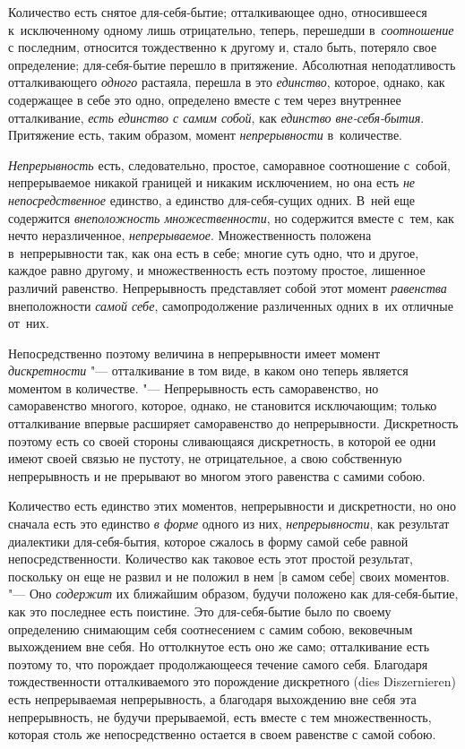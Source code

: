 

Количество есть снятое для-себя-бытие; отталкивающее одно, относившееся
к~исключенному одному лишь отрицательно, теперь, перешедши в~{\em соотношение}
с последним, относится тождественно к другому и, стало быть, потеряло свое
определение; для-себя-бытие перешло в притяжение. Абсолютная неподатливость
отталкивающего {\em одного} растаяла, перешла в это {\em единство}, которое,
однако, как содержащее в себе это одно, определено вместе с тем через
внутреннее отталкивание, {\em есть единство с самим собой}, как
{\em единство вне-себя-бытия}. Притяжение есть, таким образом, момент
{\em непрерывности} в~количестве.

{\em Непрерывность} есть, следовательно, простое, саморавное соотношение
с~собой, непрерываемое никакой границей и никаким исключением, но она есть
{\em не непосредственное} единство, а единство для-себя-сущих одних. В~ней
еще содержится {\em внеположность множественности}, но содержится вместе
с~тем, как нечто неразличенное, {\em непрерываемое}. Множественность положена
в~непрерывности так, как она есть в себе; многие суть одно, что и другое,
каждое равно другому, и множественность есть поэтому простое, лишенное
различий равенство. Непрерывность представляет собой этот момент
{\em равенства} внеположности {\em самой себе}, самопродолжение различенных
одних в~их отличные от~них.

Непосредственно поэтому величина в непрерывности имеет момент
{\em дискретности} "--- отталкивание в том виде, в каком оно теперь является
моментом в количестве. "--- Непрерывность есть саморавенство, но саморавенство
многого, которое, однако, не становится исключающим; только отталкивание
впервые расширяет саморавенство до непрерывности. Дискретность поэтому есть
со своей стороны сливающаяся дискретность, в которой ее одни имеют своей связью
не пустоту, не отрицательное, а свою собственную непрерывность и не прерывают
во многом этого равенства с самими собою.

Количество есть единство этих моментов, непрерывности и дискретности, но оно
сначала есть это единство {\em в форме} одного из них, {\em непрерывности}, как
результат диалектики для-себя-бытия, которое сжалось в форму самой себе равной
непосредственности. Количество как таковое есть этот простой результат,
поскольку он еще не развил и не положил в нем [в самом себе] своих моментов.
"--- Оно {\em содержит} их ближайшим образом, будучи положено как
для-себя-бытие, как это последнее есть поистине. Это для-себя-бытие было по
своему определению снимающим себя соотнесением с самим собою, вековечным
выхождением вне себя. Но оттолкнутое есть оно же само; отталкивание есть
поэтому то, что порождает продолжающееся течение самого себя. Благодаря
тождественности отталкиваемого это порождение дискретного (dies Diszernieren)
есть непрерываемая непрерывность, а благодаря выхождению вне себя эта
непрерывность, не будучи прерываемой, есть вместе с тем множественность,
которая столь же непосредственно остается в своем равенстве с самой собою.

